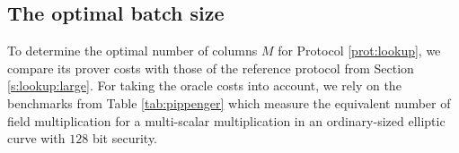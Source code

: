 \documentclass[11pt]{article}
\theoremstyle{definition}
\theoremstyle{definition}
\begin{document}
%


\subsection{The optimal batch size}
\label{s:lookup:optimalM}

To determine the optimal number of columns $M$ for Protocol \ref{prot:lookup}, we compare its prover costs with those of the reference protocol from Section \ref{s:lookup:large}.
For taking the oracle costs into account, we rely on the benchmarks from Table \ref{tab:pippenger} which measure the equivalent number of field multiplication for a multi-scalar multiplication in an ordinary-sized elliptic curve with $128$ bit security.
\end{document}
